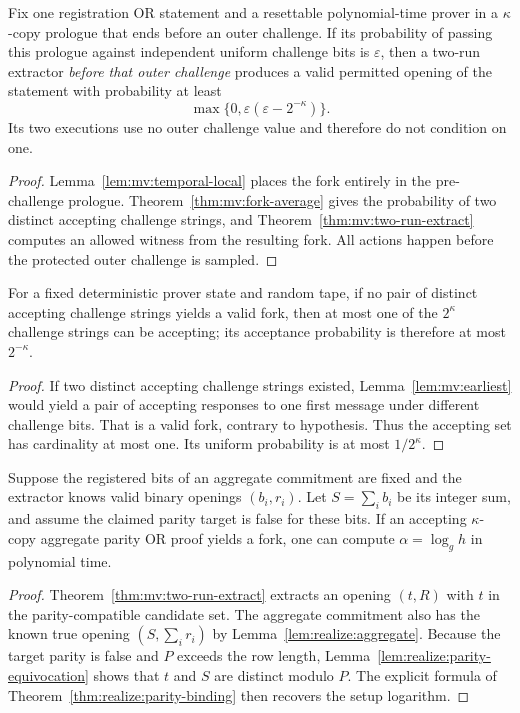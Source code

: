 \begin{theorem}\label{thm:mv:standalone-early}
Fix one registration OR statement and a
resettable polynomial-time prover in a
$\kappa$-copy prologue that ends before
an outer challenge. If its probability
of passing this prologue against
independent uniform challenge bits is
$\varepsilon$, then a two-run
extractor \emph{before that outer challenge}
produces a valid permitted opening of the
statement with probability at least
\[
 \boxed{\max\{0,\varepsilon(\varepsilon-2^{-\kappa})\}.}
\]
Its two executions use no outer challenge
value and therefore do not condition on
one.
\end{theorem}
\begin{proof}
Lemma~\ref{lem:mv:temporal-local}
places the fork entirely in the
pre-challenge prologue.
Theorem~\ref{thm:mv:fork-average}
gives the probability of two
distinct accepting challenge strings,
and Theorem~\ref{thm:mv:two-run-extract}
computes an allowed witness from the
resulting fork. All actions happen
before the protected outer challenge
is sampled.
\end{proof}

\begin{lemma}\label{lem:mv:single-leaf}
For a fixed deterministic prover state and
random tape, if no pair of distinct
accepting challenge strings yields
a valid fork, then at most one of
the $2^\kappa$ challenge strings can
be accepting; its acceptance probability
is therefore at most $2^{-\kappa}$.
\end{lemma}
\begin{proof}
If two distinct accepting challenge
strings existed, Lemma~\ref{lem:mv:earliest}
would yield a pair of accepting
responses to one first message
under different challenge bits.
That is a valid fork, contrary to
hypothesis. Thus the accepting set
has cardinality at most one.
Its uniform probability is
at most $1/2^\kappa$.
\end{proof}

\begin{lemma}\label{lem:mv:false-parity-fork}
Suppose the registered bits of an
aggregate commitment are fixed and
the extractor knows valid binary
openings $(b_i,r_i)$.
Let $S=\sum_ib_i$ be its integer
sum, and assume the claimed parity
target is false for these bits.
If an accepting $\kappa$-copy
aggregate parity OR proof yields
a fork, one can compute
$\alpha=\log_g h$ in polynomial time.
\end{lemma}
\begin{proof}
Theorem~\ref{thm:mv:two-run-extract}
extracts an opening $(t,R)$ with
$t$ in the parity-compatible candidate
set. The aggregate commitment also
has the known true opening
$(S,\sum_ir_i)$ by
Lemma~\ref{lem:realize:aggregate}.
Because the target parity is false
and $P$ exceeds the row length,
Lemma~\ref{lem:realize:parity-equivocation}
shows that $t$ and $S$ are distinct
modulo $P$. The explicit formula of
Theorem~\ref{thm:realize:parity-binding}
then recovers the setup logarithm.
\end{proof}

